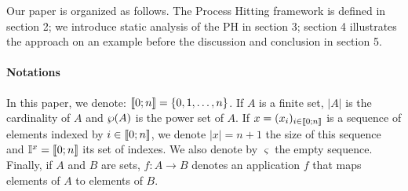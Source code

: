 Our paper is organized as follows.
The Process Hitting framework is defined in section 2;
we introduce static analysis of the PH in section 3;
section 4 illustrates the approach on an example
before the discussion and conclusion in section 5.

\paragraph*{Notations}
In this paper, we denote: $\llbracket 0; n \rrbracket = \{0, 1, \dots, n\}$.
If $A$ is a finite set,
$|A|$ is the cardinality of $A$
and $\wp(A)$ is the power set of $A$.
If $x = (x_i)_{i \in \llbracket 0; n \rrbracket}$ is a sequence of elements indexed by $i \in \llbracket 0; n \rrbracket$,
we denote $|x| = n+1$ the size of this sequence
and $\mathbb{I}^{x} = \llbracket 0; n \rrbracket$ its set of indexes.
We also denote by $\varsigma$ the empty sequence.
Finally, if $A$ and $B$ are sets,
$f : A \rightarrow B$ denotes an application $f$ that maps elements of $A$ to elements of $B$.